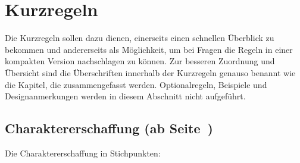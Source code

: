 \chapter{Kurzregeln}
Die Kurzregeln sollen dazu dienen, einerseits einen schnellen Überblick zu bekommen und andererseits als Möglichkeit, um bei Fragen die Regeln in einer kompakten Version nachschlagen zu können. Zur besseren Zuordnung und Übersicht sind die Überschriften innerhalb der Kurzregeln genauso benannt wie die Kapitel, die zusammengefasst werden. Optionalregeln, Beispiele und Designanmerkungen werden in diesem Abschnitt nicht aufgeführt.

\section[Charaktererschaffung]{Charaktererschaffung (ab Seite~\pageref{Ch:Charaktererschaffung})}
Die Charaktererschaffung in Stichpunkten:
